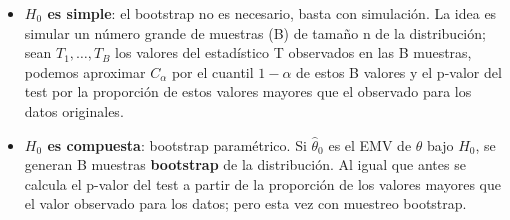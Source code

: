 \begin{itemize}
    \item \textbf{$H_0$ es simple}: el bootstrap no es necesario, basta con simulación. La idea es simular un número grande de muestras (B) de tamaño n de la distribución; sean $T_1,\dots,T_B$ los valores del estadístico T observados en las B muestras, podemos aproximar $C_\alpha$ por el cuantil $1-\alpha$ de estos B valores y el p-valor del test por la proporción de estos valores mayores que el observado para los datos originales.
    \item \textbf{$H_0$ es compuesta}: bootstrap paramétrico. Si $\hat\theta_0$ es el EMV de $\theta$ bajo $H_0$, se generan B muestras \textbf{bootstrap} de la distribución. Al igual que antes se calcula el p-valor del test a partir de la proporción de los valores mayores que el valor observado para los datos; pero esta vez con muestreo bootstrap.
\end{itemize}

